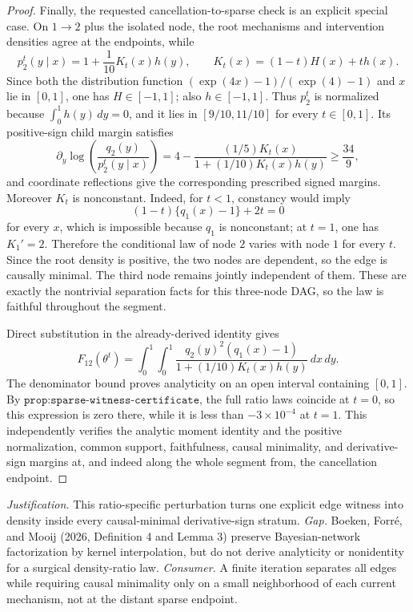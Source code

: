 \documentclass{article}
\begin{document}
\begin{proof}
Finally, the requested cancellation-to-sparse check is an explicit special case. On \(1\to2\) plus the isolated node, the root mechanisms and intervention densities agree at the endpoints, while
\[
 p_2^t(y\mid x)=1+\frac{1}{10}K_t(x)h(y),
 \qquad
 K_t(x)=(1-t)H(x)+t h(x).
\]
Since both the distribution function \((\exp(4x)-1)/(\exp(4)-1)\) and \(x\) lie in \([0,1]\), one has \(H\in[-1,1]\); also \(h\in[-1,1]\). Thus \(p_2^t\) is normalized because \(\int_0^1h(y)\,dy=0\), and it lies in \([9/10,11/10]\) for every \(t\in[0,1]\). Its positive-sign child margin satisfies
\[
 \partial_y\log\!\left(\frac{q_2(y)}{p_2^t(y\mid x)}\right)
 =4-\frac{(1/5)K_t(x)}{1+(1/10)K_t(x)h(y)}
 \ge \frac{34}{9},
\]
and coordinate reflections give the corresponding prescribed signed margins. Moreover \(K_t\) is nonconstant. Indeed, for \(t<1\), constancy would imply
\[
 (1-t)\{q_1(x)-1\}+2t=0
\]
for every \(x\), which is impossible because \(q_1\) is nonconstant; at \(t=1\), one has \(K_1'=2\). Therefore the conditional law of node \(2\) varies with node \(1\) for every \(t\). Since the root density is positive, the two nodes are dependent, so the edge is causally minimal. The third node remains jointly independent of them. These are exactly the nontrivial separation facts for this three-node DAG, so the law is faithful throughout the segment.

Direct substitution in the already-derived identity gives
\[
 F_{12}(\theta^t)=
 \int_0^1\!\int_0^1
 \frac{q_2(y)^2(q_1(x)-1)}{1+(1/10)K_t(x)h(y)}\,dx\,dy.
\]
The denominator bound proves analyticity on an open interval containing \([0,1]\). By \(\texttt{prop:sparse-witness-certificate}\), the full ratio laws coincide at \(t=0\), so this expression is zero there, while it is less than \(-3\times10^{-4}\) at \(t=1\). This independently verifies the analytic moment identity and the positive normalization, common support, faithfulness, causal minimality, and derivative-sign margins at, and indeed along the whole segment from, the cancellation endpoint.
\end{proof}
\par\smallskip\noindent \textit{Justification.} This ratio-specific perturbation turns one explicit edge witness into density inside every causal-minimal derivative-sign stratum. \textit{Gap.} Boeken, Forr\'e, and Mooij (2026, Definition 4 and Lemma 3) preserve Bayesian-network factorization by kernel interpolation, but do not derive analyticity or nonidentity for a surgical density-ratio law. \textit{Consumer.} A finite iteration separates all edges while requiring causal minimality only on a small neighborhood of each current mechanism, not at the distant sparse endpoint.
\end{document}

